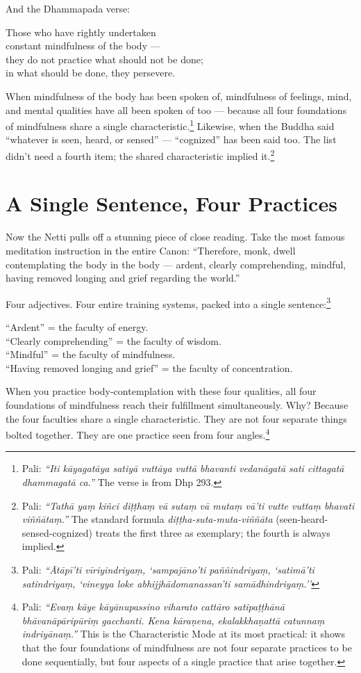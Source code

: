 And the Dhammapada verse:

\begin{versebox}
Those who have rightly undertaken\\
constant mindfulness of the body ---\\
they do not practice what should not be done;\\
in what should be done, they persevere.
\end{versebox}

When mindfulness of the body has been spoken of, mindfulness of feelings, mind, and mental qualities have all been spoken of too --- because all four foundations of mindfulness share a single characteristic.\footnote{Pali: \textit{``Iti kāyagatāya satiyā vuttāya vuttā bhavanti vedanāgatā sati cittagatā dhammagatā ca.''} The verse is from Dhp 293.} Likewise, when the Buddha said ``whatever is seen, heard, or sensed'' --- ``cognized'' has been said too. The list didn't need a fourth item; the shared characteristic implied it.\footnote{Pali: \textit{``Tathā yaṃ kiñci diṭṭhaṃ vā sutaṃ vā mutaṃ vā'ti vutte vuttaṃ bhavati viññātaṃ.''} The standard formula \textit{diṭṭha-suta-muta-viññāta} (seen-heard-sensed-cognized) treats the first three as exemplary; the fourth is always implied.}

\section*{A Single Sentence, Four Practices}

Now the Netti pulls off a stunning piece of close reading. Take the most famous meditation instruction in the entire Canon: ``Therefore, monk, dwell contemplating the body in the body --- ardent, clearly comprehending, mindful, having removed longing and grief regarding the world.''

Four adjectives. Four entire training systems, packed into a single sentence:\footnote{Pali: \textit{``Ātāpī'ti vīriyindriyaṃ, `sampajāno'ti paññindriyaṃ, `satimā'ti satindriyaṃ, `vineyya loke abhijjhādomanassan'ti samādhindriyaṃ.''}}

``Ardent'' = the faculty of energy.\\
``Clearly comprehending'' = the faculty of wisdom.\\
``Mindful'' = the faculty of mindfulness.\\
``Having removed longing and grief'' = the faculty of concentration.

When you practice body-contemplation with these four qualities, all four foundations of mindfulness reach their fulfillment simultaneously. Why? Because the four faculties share a single characteristic. They are not four separate things bolted together. They are one practice seen from four angles.\footnote{Pali: \textit{``Evaṃ kāye kāyānupassino viharato cattāro satipaṭṭhānā bhāvanāpāripūriṃ gacchanti. Kena kāraṇena, ekalakkhaṇattā catunnaṃ indriyānaṃ.''} This is the Characteristic Mode at its most practical: it shows that the four foundations of mindfulness are not four separate practices to be done sequentially, but four aspects of a single practice that arise together.}

